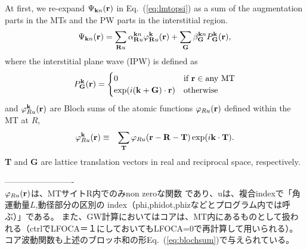 \documentclass[twocolumn,showpacs,preprintnumbers,amsmath,amssymb,floatfix]{revtex4-1}
\newcommand{\bfk}{{\bf k}}
\newcommand{\bfr}{{\bf r}}
\newcommand{\bfR}{{\bf R}}
\def\Psikn{\Psi_{{\bf k}n}}
\newcommand{\req}[1]{\mbox{Eq.~\!(\ref{#1})}}
\def\Psikn{{\Psi_{{\bf k}n}}}
\def\Psikn{{\Psi_{{\bf k}n}}}
\def\Psikn{{\Psi_{{\bf k}n}}}
\begin{document}
At first, we re-expand $\Psikn(\bfr)$ in \req{eq:lmtopsi}  
as a sum of the augmentation parts in the MTs and the
PW parts in the interstitial region.
\begin{eqnarray}
\Psikn(\bfr)
= \sum_{\bfR u}  \alpha^{{\bfk}n}_{\bfR u} \varphi^{\bf k}_{\bfR u}({\bf r})
 + \sum_{\bf G}  \beta^{{\bfk}n}_{\bf G} P^{\bf k}_{\bf G}({\bf r}),
\label{def:psiexp}
\end{eqnarray}
where the interstitial plane wave (IPW) is defined as
\begin{eqnarray}
P^{\bf k}_{\bf G}({\bf r}) =
\begin{cases}
 0                           & \text{if {\bf r}} \in \text{any MT} \\
\exp (i ({\bf k+G})\cdot{\bf r}) & \text{otherwise}
\end{cases}
\end{eqnarray}
and $\varphi^{\bf k}_{R u}(\bfr)$ are Bloch sums of the atomic functions
$\varphi_{R u}(\bfr)$ defined within the MT at $R$,
\begin{eqnarray}
\varphi^{\bf k}_{R u}({\bf r}) &\equiv& \sum_{\bf T} \varphi_{R u}({\bf
 r-R-T}) \exp(i {\bf k\cdot{}T}).
\label{eq:blochsum}
\end{eqnarray}
{\bf T} and {\bf G} are lattice translation vectors in real and reciprocal
space, respectively. 

-------------------------\\
$\varphi_{Ru}(\bfr)$は、MTサイトR内でのみnon zeroな関数
であり、uは、複合indexで「角運動量$L$,動径部分の区別の
index（phi,phidot,phizなどとプログラム内では呼ぶ）」である。
また、GW計算においてはコアは、MT内にあるものとして扱われる（ctrlでLFOCA＝１にしておいてもLFOCA=0で再計算して用いられる）。
コア波動関数も上述のブロッホ和の形\req{eq:blochsum}で与えられている。
\end{document}
